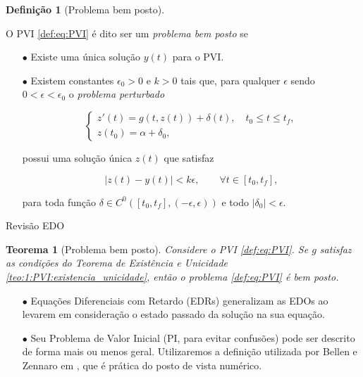 \documentclass{beamer}
\theoremstyle{plain}
\newtheorem{teo}{Teorema}
\theoremstyle{definition}
\newtheorem{defi}{Definição}
\begin{document}
\begin{frame}
    \begin{defi}[Problema bem posto]
         \label{def:3:problema_bem_posto}
            
         O PVI \eqref{def:eq:PVI} é dito ser um \textit{problema bem posto} se 
         \begin{itemize}
             \item[$\bullet$] Existe uma única solução $y(t)$ para o PVI.
         \item[$\bullet$] Existem constantes $\epsilon_0 > 0$ e $k>0$ tais que, para qualquer $\epsilon $ sendo $0 < \epsilon < \epsilon_0$ o \textit{problema perturbado}


         \begin{equation*}
             \begin{cases}
                 z'(t) = g(t, z(t))+\delta(t), \quad  t_0 \leq t \leq t_f, \\
                 z(t_0)=\alpha+\delta_0,
             \end{cases}
         \end{equation*}

         possui uma solução única $z(t)$ que satisfaz

         \begin{equation*}
             |z(t)-y(t)|<k \epsilon, \qquad \forall t \in [t_0, t_f],
         \end{equation*} 
        
         para toda função $\delta \in C^0([t_0, t_f], (-\epsilon, \epsilon))$ e todo $|\delta_0| < \epsilon$.
         \end{itemize}

     \end{defi}
\end{frame}


\begin{frame}{Revisão EDO}
    \begin{teo}[Problema bem posto]
        \label{teo:2:problema_bem_posto}
        Considere o PVI \eqref{def:eq:PVI}. Se $g$ satisfaz as condições do Teorema de Existência
        e Unicidade \ref{teo:1:PVI:existencia_unicidade}, então o problema \eqref{def:eq:PVI} é bem posto.
    \end{teo}

        \begin{itemize}
            \item[$\bullet$] Equações Diferenciais com Retardo (EDRs) generalizam as EDOs ao levarem em consideração o estado passado da solução na sua equação.
            \item[$\bullet$] Seu Problema de Valor Inicial (PI, para evitar confusões) pode ser descrito de forma mais ou menos geral. Utilizaremos a definição utilizada por Bellen e Zennaro em \cite{zennaro}  , que é prática do posto de vista numérico.
        \end{itemize}


\end{frame}
\end{document}
